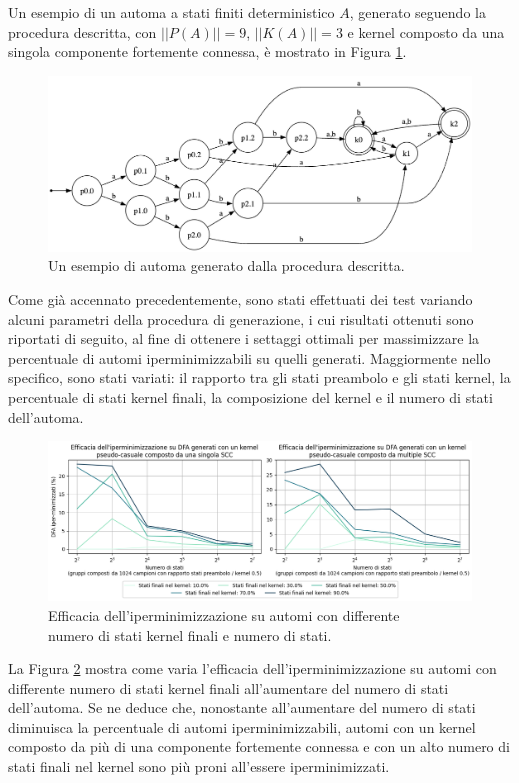 \documentclass[a4paper,12pt,twoside, openright]{report} %
\begin{document}
Un esempio di un automa a stati finiti deterministico $A$, generato seguendo la procedura descritta,
con $||P(A)|| = 9$, $||K(A)|| = 3$ e kernel composto da una singola componente fortemente connessa,
è mostrato in Figura \ref{fig:gen-dfa}.

\begin{figure}[!htb]
  \centering
  \includegraphics[width=0.8\linewidth]{images/gen_dfa.png}
  \caption{\label{fig:gen-dfa}Un esempio di automa generato dalla procedura descritta.}
\end{figure}

Come già accennato precedentemente, sono stati effettuati dei test variando alcuni parametri della
procedura di generazione, i cui risultati ottenuti sono riportati di seguito, al fine di ottenere i
settaggi ottimali per massimizzare la percentuale di automi iperminimizzabili su
quelli generati. Maggiormente nello specifico, sono stati variati: il rapporto tra gli stati
preambolo e gli stati kernel, la percentuale di stati kernel finali, la composizione
del kernel e il numero di stati dell'automa.

\begin{figure}[!htb]
  \centering
  \includegraphics[width=1\linewidth]{images/dfa_gen_fstates_nstates.png}
  \caption{\label{fig:dfa-gen-fstates-nstates}Efficacia dell'iperminimizzazione 
  su automi con differente\\numero di stati kernel finali e numero di stati.}
\end{figure}

La Figura \ref{fig:dfa-gen-fstates-nstates} mostra come varia l'efficacia dell'iperminimizzazione 
su automi con differente numero di stati kernel finali all'aumentare del numero di stati dell'automa.
Se ne deduce che, nonostante all'aumentare del numero di stati diminuisca la percentuale di automi
iperminimizzabili, automi con un kernel composto da più di una componente fortemente connessa e con un alto
numero di stati finali nel kernel sono più proni all'essere iperminimizzati.
\end{document}
